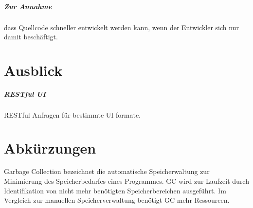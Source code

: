 \documentclass[
12pt,
english,
ngerman,
headsepline,
twoside,
openright,
numbers=noenddot,version=first
]{scrreprt}
\begin{document}
\paragraph{Zur Annahme} dass Quellcode schneller entwickelt werden kann, wenn der Entwickler sich nur damit beschäftigt.

\chapter{Ausblick}



\paragraph{RESTful UI}
RESTful Anfragen für bestimmte UI formate.

\lstlistoflistings


\listoftables


\chapter*{Abkürzungen}


\begin{acronym}[Bash]



\glqq Garbage Collection\grqq{} bezeichnet die automatische Speicherwaltung zur Minimierung des Speicherbedarfes eines Programmes.
\ac{GC} wird zur Laufzeit durch Identifikation von nicht mehr benötigten Speicherbereichen ausgeführt.
Im Vergleich zur manuellen Speicherverwaltung benötigt \ac{GC} mehr Ressourcen.

\end{acronym}



\end{document}
